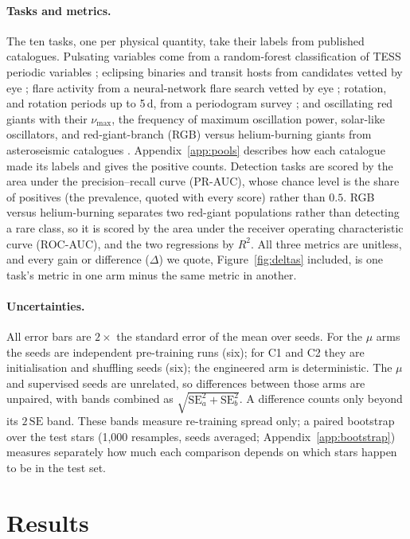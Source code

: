\documentclass{article}
\begin{document}
\paragraph{Tasks and metrics.} The ten tasks, one per physical quantity, take their labels from
published catalogues. Pulsating variables come from a random-forest classification of TESS periodic
variables \citep{gao2025}; eclipsing binaries and transit hosts from candidates vetted by eye
\citep{prsa2022,guerrero2021}; flare activity from a neural-network flare search vetted by eye
\citep{seli2025,vida2021}; rotation, and rotation periods up to 5\,d, from a periodogram survey
\citep{boyle2026}; and oscillating red giants with their $\nu_{\max}$, the frequency of maximum
oscillation power, solar-like oscillators, and red-giant-branch (RGB) versus helium-burning giants
from asteroseismic catalogues \citep{hon2021,hatt2023,sreenivas2026}. Appendix~\ref{app:pools}
describes how each catalogue made its labels and gives the positive counts. Detection tasks are scored
by the area under the precision--recall curve (PR-AUC), whose chance level is the share of positives
(the prevalence, quoted with every score) rather than $0.5$. RGB versus helium-burning separates two
red-giant populations rather than detecting a rare class, so it is scored by the area under the
receiver operating characteristic curve (ROC-AUC), and the two regressions by $R^{2}$. All three
metrics are unitless, and every gain or difference ($\Delta$) we quote, Figure~\ref{fig:deltas}
included, is one task's metric in one arm minus the same metric in another.

\paragraph{Uncertainties.} All error bars are $2\times$ the standard error of the mean over seeds.
For the $\mu$ arms the seeds are independent pre-training runs (six); for C1 and C2 they are
initialisation and shuffling seeds (six); the engineered arm is
deterministic. The $\mu$ and supervised seeds are unrelated, so differences between those arms are
unpaired, with bands combined as $\sqrt{\mathrm{SE}_a^{2}+\mathrm{SE}_b^{2}}$. A difference counts
only beyond its $2\,\mathrm{SE}$ band. These bands
measure re-training spread only; a paired bootstrap over the test stars (1{,}000 resamples, seeds
averaged; Appendix~\ref{app:bootstrap}) measures separately how much each comparison depends on
which stars happen to be in the test set.

\section{Results}
\end{document}
